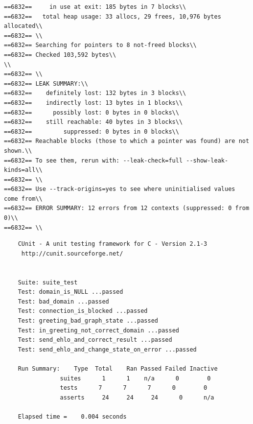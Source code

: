 \documentclass[a4paper,12pt]{report}
\begin{document}
\begin{verbatim}
==6832==     in use at exit: 185 bytes in 7 blocks\\
==6832==   total heap usage: 33 allocs, 29 frees, 10,976 bytes allocated\\
==6832== \\
==6832== Searching for pointers to 8 not-freed blocks\\
==6832== Checked 103,592 bytes\\
\\
==6832== \\
==6832== LEAK SUMMARY:\\
==6832==    definitely lost: 132 bytes in 3 blocks\\
==6832==    indirectly lost: 13 bytes in 1 blocks\\
==6832==      possibly lost: 0 bytes in 0 blocks\\
==6832==    still reachable: 40 bytes in 3 blocks\\
==6832==         suppressed: 0 bytes in 0 blocks\\
==6832== Reachable blocks (those to which a pointer was found) are not shown.\\
==6832== To see them, rerun with: --leak-check=full --show-leak-kinds=all\\
==6832== \\
==6832== Use --track-origins=yes to see where uninitialised values come from\\
==6832== ERROR SUMMARY: 12 errors from 12 contexts (suppressed: 0 from 0)\\
==6832== \\
\end{verbatim}

\begin{verbatim}
    CUnit - A unit testing framework for C - Version 2.1-3
     http://cunit.sourceforge.net/


    Suite: suite_test
    Test: domain_is_NULL ...passed
    Test: bad_domain ...passed
    Test: connection_is_blocked ...passed
    Test: greeting_bad_graph_state ...passed
    Test: in_greeting_not_correct_domain ...passed
    Test: send_ehlo_and_correct_result ...passed
    Test: send_ehlo_and_change_state_on_error ...passed

    Run Summary:    Type  Total    Ran Passed Failed Inactive
                suites      1      1    n/a      0        0
                tests      7      7      7      0        0
                asserts     24     24     24      0      n/a

    Elapsed time =    0.004 seconds
\end{verbatim}
\end{document}
